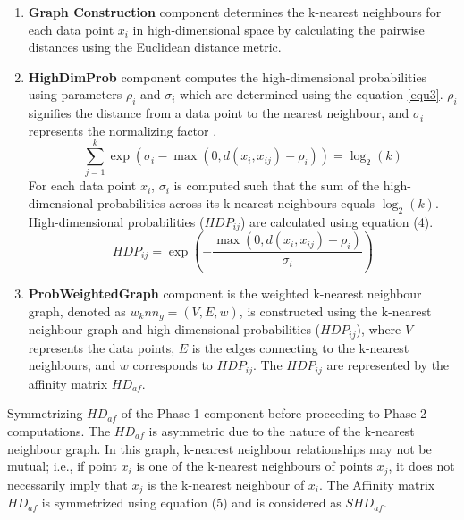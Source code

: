 \begin{enumerate}[label=\roman*]
    \item \textbf{ Graph Construction} component determines the k-nearest neighbours for each data point $x_i$ in high-dimensional space by calculating the pairwise distances using the Euclidean distance metric.
    
    \item \textbf{HighDimProb} component computes the high-dimensional  probabilities using parameters $\rho_i$ and $\sigma_i$ which are determined  using the equation \ref{equ3}. $\rho_i$ signifies the distance from a data point to the  nearest neighbour, and $\sigma_i$ represents the normalizing factor \cite{umap_reference}.
    \begin{equation}\label{equ3}
      \sum_{j=1}^{k} \exp\left( \sigma_i - \max(0, d(x_i, x_{ij}) - \rho_i) \right) = \log_2(k)  
    \end{equation}
    For each data point $x_i$, $\sigma_i$ is computed such that the sum of the high-dimensional probabilities across its k-nearest neighbours equals $\log_2(k)$. High-dimensional probabilities ($HDP_{ij}$) are calculated \cite{umap_reference} using equation (4).
    \begin{equation}
        HDP_{ij} = \exp\left( -\frac{\max(0, d(x_i, x_{ij}) - \rho_i)}{\sigma_i} \right)
    \end{equation}

    \item \textbf{ProbWeightedGraph} component is the weighted k-nearest neighbour graph, denoted as $w_knn_g=(V,E,w)$, is constructed using the k-nearest neighbour graph and high-dimensional probabilities ($HDP_{ij}$), where $V$ represents the data points, $E$ is the edges connecting to the k-nearest neighbours, and $w$ corresponds to $HDP_{ij}$. The $HDP_{ij}$ are represented by the affinity matrix $HD_{af}$.    

\end{enumerate}

Symmetrizing $HD_{af}$ of the Phase 1 component before proceeding to Phase 2 computations. The $HD_{af}$ is asymmetric due to the nature of the k-nearest neighbour graph. In this graph, k-nearest neighbour relationships may not be mutual; i.e., if point $x_i$ is one of the k-nearest neighbours of points $x_j$, it does not necessarily imply that $x_j$ is the k-nearest neighbour of $x_i$. The Affinity matrix $HD_{af}$ is symmetrized \cite{umap_reference} using equation (5) and is considered as $SHD_{af}$.

